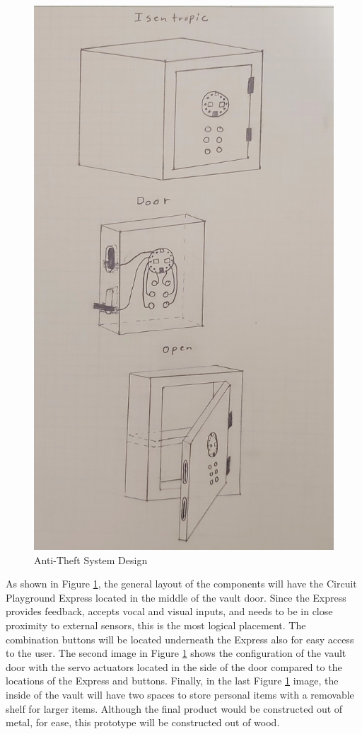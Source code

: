 \documentclass[12pt]{article}
\begin{document}
\begin{figure}[!t]
\centering
\includegraphics[width=4.5in]{Prop1.jpg}
\caption{Anti-Theft System Design}
\label{fig:Prop1}
\end{figure}

As shown in Figure \ref{fig:Prop1}, the general layout of the components will have the Circuit Playground Express located in the middle of the vault door. Since the Express provides feedback, accepts vocal and visual inputs, and needs to be in close proximity to external sensors, this is the most logical placement. The combination buttons will be located underneath the Express also for easy access to the user. The second image in Figure \ref{fig:Prop1} shows the configuration of the vault door with the servo actuators located in the side of the door compared to the locations of the Express and buttons. Finally, in the last Figure \ref{fig:Prop1} image, the inside of the vault will have two spaces to store personal items with a removable shelf for larger items. Although the final product would be constructed out of metal, for ease, this prototype will be constructed out of wood.
\end{document}
